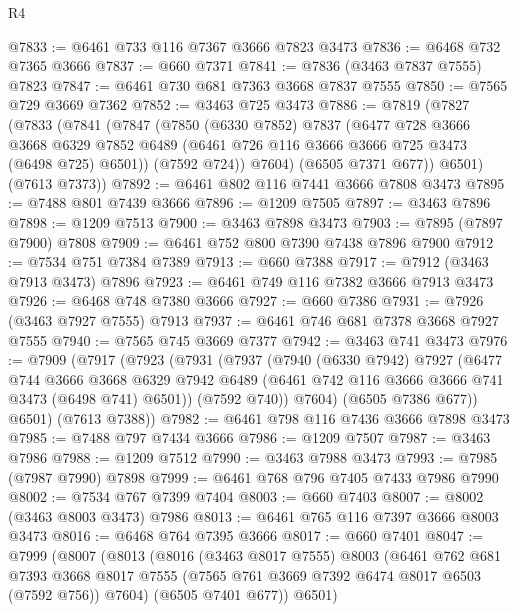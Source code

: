 \begin{lexlean}{R4}
\begin{coremodule}
@7833 := @6461 @733 @116 @7367 @3666 @7823 @3473
@7836 := @6468 @732 @7365 @3666
@7837 := @660 @7371
@7841 := @7836 (@3463 @7837 @7555) @7823
@7847 := @6461 @730 @681 @7363 @3668 @7837 @7555
@7850 := @7565 @729 @3669 @7362
@7852 := @3463 @725 @3473
@7886 := @7819
    (@7827
      (@7833
        (@7841
          (@7847
            (@7850
              (@6330 @7852)
              @7837
              (@6477
                @728
                @3666
                @3668
                @6329
                @7852
                @6489
                (@6461 @726 @116 @3666 @3666 @725 @3473 (@6498 @725) @6501))
              (@7592 @724))
            @7604)
          (@6505 @7371 @677))
        @6501)
      (@7613 @7373))
@7892 := @6461 @802 @116 @7441 @3666 @7808 @3473
@7895 := @7488 @801 @7439 @3666
@7896 := @1209 @7505
@7897 := @3463 @7896
@7898 := @1209 @7513
@7900 := @3463 @7898 @3473
@7903 := @7895 (@7897 @7900) @7808
@7909 := @6461 @752 @800 @7390 @7438 @7896 @7900
@7912 := @7534 @751 @7384 @7389
@7913 := @660 @7388
@7917 := @7912 (@3463 @7913 @3473) @7896
@7923 := @6461 @749 @116 @7382 @3666 @7913 @3473
@7926 := @6468 @748 @7380 @3666
@7927 := @660 @7386
@7931 := @7926 (@3463 @7927 @7555) @7913
@7937 := @6461 @746 @681 @7378 @3668 @7927 @7555
@7940 := @7565 @745 @3669 @7377
@7942 := @3463 @741 @3473
@7976 := @7909
    (@7917
      (@7923
        (@7931
          (@7937
            (@7940
              (@6330 @7942)
              @7927
              (@6477
                @744
                @3666
                @3668
                @6329
                @7942
                @6489
                (@6461 @742 @116 @3666 @3666 @741 @3473 (@6498 @741) @6501))
              (@7592 @740))
            @7604)
          (@6505 @7386 @677))
        @6501)
      (@7613 @7388))
@7982 := @6461 @798 @116 @7436 @3666 @7898 @3473
@7985 := @7488 @797 @7434 @3666
@7986 := @1209 @7507
@7987 := @3463 @7986
@7988 := @1209 @7512
@7990 := @3463 @7988 @3473
@7993 := @7985 (@7987 @7990) @7898
@7999 := @6461 @768 @796 @7405 @7433 @7986 @7990
@8002 := @7534 @767 @7399 @7404
@8003 := @660 @7403
@8007 := @8002 (@3463 @8003 @3473) @7986
@8013 := @6461 @765 @116 @7397 @3666 @8003 @3473
@8016 := @6468 @764 @7395 @3666
@8017 := @660 @7401
@8047 := @7999
    (@8007
      (@8013
        (@8016
          (@3463 @8017 @7555)
          @8003
          (@6461
            @762
            @681
            @7393
            @3668
            @8017
            @7555
            (@7565 @761 @3669 @7392 @6474 @8017 @6503 (@7592 @756))
            @7604)
          (@6505 @7401 @677))
        @6501)

\end{coremodule}
\end{lexlean}

